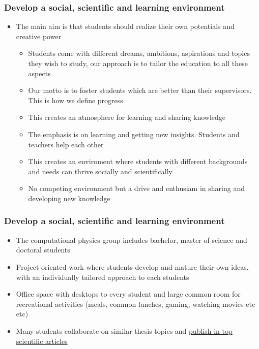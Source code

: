 \documentclass{beamer}
\begin{document}
\begin{frame}
\frametitle{Develop a social, scientific and learning environment}

\begin{block}{}
\begin{itemize}
\item The main aim is that students should realize their own potentials and creative power
\begin{itemize}

 \item Students come with different dreams, ambitions, aspirations and topics they wish to study, our approach is to tailor the education to all these aspects

 \item Our motto is to foster students which are better than their supervisors. This is how we define progress

 \item This creates an atmosphere for learning and sharing knowledge

 \item The emphasis is on learning and getting new insights. Students and teachers help each other

 \item This creates an enviroment where students with different backgrounds and needs can thrive socially and scientifically

 \item No competing environment but a drive and enthusiam in sharing and developing new knowledge
\end{itemize}

\noindent
\end{itemize}

\noindent
\end{block}
\end{frame}

\begin{frame}
\frametitle{Develop a social, scientific and learning environment}

\begin{block}{}
\begin{itemize}
\item The computational physics group includes bachelor, master of science and doctoral students

\item Project oriented work where students develop and mature their own ideas, with an individually tailored approach to each students

\item Office space with desktops to every student and large common room for recreational activities (meals, common lunches, gaming, watching movies etc etc)

\item Many students collaborate on similar  thesis topics and \href{{http://www.dn.no/talent/2014/06/12/Utdannelse/sommervikar-ble-toppforsker}}{publish in top scientific articles}
\end{itemize}

\noindent
\end{block}
\end{frame}
\end{document}
